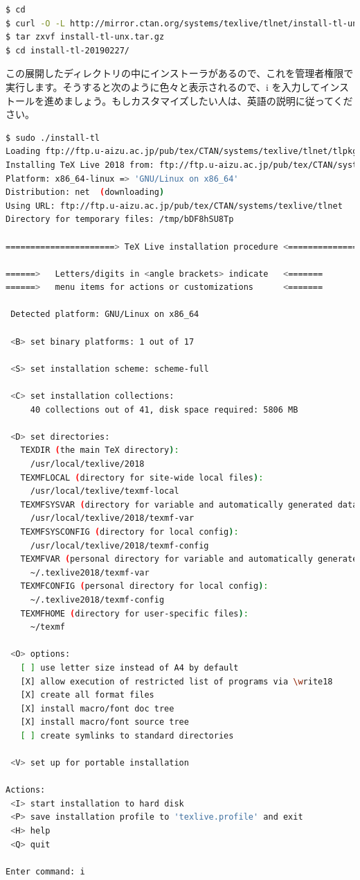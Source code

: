 \begin{lstlisting}[language=bash]
$ cd
$ curl -O -L http://mirror.ctan.org/systems/texlive/tlnet/install-tl-unx.tar.gz
$ tar zxvf install-tl-unx.tar.gz
$ cd install-tl-20190227/
\end{lstlisting}

この展開したディレクトリの中にインストーラがあるので、これを管理者権限で実行します。そうすると次のように色々と表示されるので、i を入力してインストールを進めましょう。もしカスタマイズしたい人は、英語の説明に従ってください。

\begin{lstlisting}[language=bash]
$ sudo ./install-tl
Loading ftp://ftp.u-aizu.ac.jp/pub/tex/CTAN/systems/texlive/tlnet/tlpkg/texlive.tlpdb
Installing TeX Live 2018 from: ftp://ftp.u-aizu.ac.jp/pub/tex/CTAN/systems/texlive/tlnet (verified)
Platform: x86_64-linux => 'GNU/Linux on x86_64'
Distribution: net  (downloading)
Using URL: ftp://ftp.u-aizu.ac.jp/pub/tex/CTAN/systems/texlive/tlnet
Directory for temporary files: /tmp/bDF8hSU8Tp

======================> TeX Live installation procedure <=====================

======>   Letters/digits in <angle brackets> indicate   <=======
======>   menu items for actions or customizations      <=======

 Detected platform: GNU/Linux on x86_64
 
 <B> set binary platforms: 1 out of 17

 <S> set installation scheme: scheme-full

 <C> set installation collections:
     40 collections out of 41, disk space required: 5806 MB

 <D> set directories:
   TEXDIR (the main TeX directory):
     /usr/local/texlive/2018
   TEXMFLOCAL (directory for site-wide local files):
     /usr/local/texlive/texmf-local
   TEXMFSYSVAR (directory for variable and automatically generated data):
     /usr/local/texlive/2018/texmf-var
   TEXMFSYSCONFIG (directory for local config):
     /usr/local/texlive/2018/texmf-config
   TEXMFVAR (personal directory for variable and automatically generated data):
     ~/.texlive2018/texmf-var
   TEXMFCONFIG (personal directory for local config):
     ~/.texlive2018/texmf-config
   TEXMFHOME (directory for user-specific files):
     ~/texmf

 <O> options:
   [ ] use letter size instead of A4 by default
   [X] allow execution of restricted list of programs via \write18
   [X] create all format files
   [X] install macro/font doc tree
   [X] install macro/font source tree
   [ ] create symlinks to standard directories

 <V> set up for portable installation

Actions:
 <I> start installation to hard disk
 <P> save installation profile to 'texlive.profile' and exit
 <H> help
 <Q> quit

Enter command: i
\end{lstlisting}

